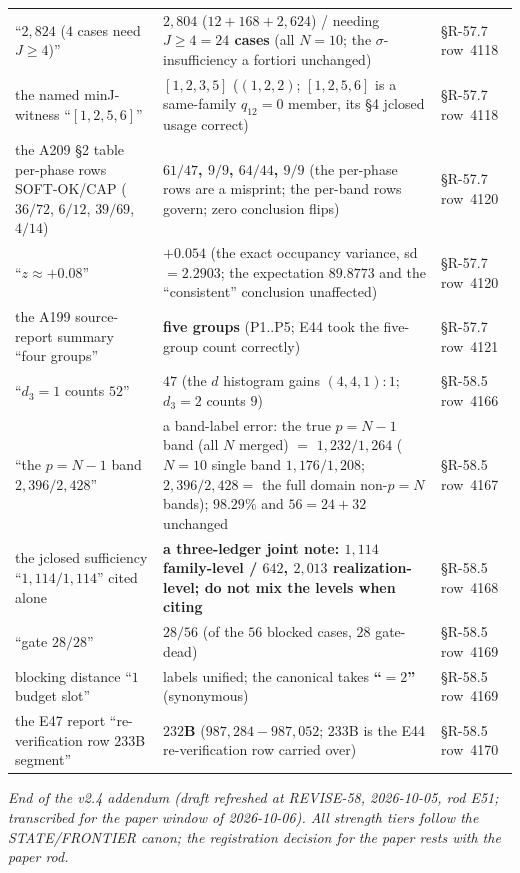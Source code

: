 \begin{longtable}{p{}p{}p{}}
``$2{,}824$ ($4$ cases need $J\ge4$)'' & \textbf{$2{,}804$} ($12+168+2{,}624$) / needing $J\ge4=$\textbf{$24$ cases} (all $N=10$; the $\sigma$-insufficiency a fortiori unchanged) & \S R-57.7 row~4118 \\
the named minJ-witness ``$[1,2,5,6]$'' & \textbf{$[1,2,3,5]$} ($(1,2,2)$; $[1,2,5,6]$ is a same-family $q_{12}=0$ member, its \S4 jclosed usage correct) & \S R-57.7 row~4118 \\
the A209 \S2 table per-phase rows SOFT-OK/CAP ($36/72$, $6/12$, $39/69$, $4/14$) & \textbf{$61/47$, $9/9$, $64/44$, $9/9$} (the per-phase rows are a misprint; the per-band rows govern; zero conclusion flips) & \S R-57.7 row~4120 \\
``$z\approx+0.08$'' & \textbf{$+0.054$} (the exact occupancy variance, sd$=2.2903$; the expectation $89.8773$ and the ``consistent'' conclusion unaffected) & \S R-57.7 row~4120 \\
the A199 source-report summary ``four groups'' & \textbf{five groups} (P1..P5; E44 took the five-group count correctly) & \S R-57.7 row~4121 \\
``$d_3=1$ counts $52$'' & \textbf{$47$} (the $d$ histogram gains $(4,4,1){:}1$; $d_3=2$ counts $9$) & \S R-58.5 row~4166 \\
``the $p=N-1$ band $2{,}396/2{,}428$'' & a band-label error: the true $p=N-1$ band (all $N$ merged) $=$ \textbf{$1{,}232/1{,}264$} ($N=10$ single band $1{,}176/1{,}208$; $2{,}396/2{,}428=$ the full domain non-$p=N$ bands); $98.29\%$ and $56=24+32$ unchanged & \S R-58.5 row~4167 \\
the jclosed sufficiency ``$1{,}114/1{,}114$'' cited alone & \textbf{a three-ledger joint note: $1{,}114$ family-level / $642$, $2{,}013$ realization-level; do not mix the levels when citing} & \S R-58.5 row~4168 \\
``gate $28/28$'' & \textbf{$28/56$} (of the $56$ blocked cases, $28$ gate-dead) & \S R-58.5 row~4169 \\
blocking distance ``$1$ budget slot'' & labels unified; the canonical takes \textbf{``$=2$''} (synonymous) & \S R-58.5 row~4169 \\
the E47 report ``re-verification row $233$B segment'' & \textbf{$232$B} ($987{,}284-987{,}052$; $233$B is the E44 re-verification row carried over) & \S R-58.5 row~4170 \\
\end{longtable}

\noindent\emph{End of the v2.4 addendum (draft refreshed at REVISE-58,
2026-10-05, rod E51; transcribed for the paper window of 2026-10-06). All
strength tiers follow the STATE/FRONTIER canon; the registration decision
for the paper rests with the paper rod.}
